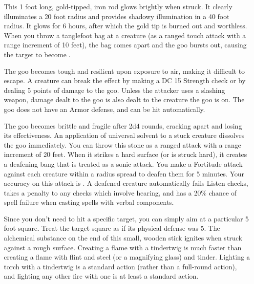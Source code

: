  This 1 foot long, gold-tipped, iron rod glows brightly when struck. It clearly illuminates a 20 foot radius and provides shadowy illumination in a 40 foot radius. It glows for 6 hours, after which the gold tip is burned out and worthless.
 When you throw a tanglefoot bag at a creature (as a ranged touch attack with a range increment of 10 feet), the bag comes apart and the goo bursts out, causing the target to become \entangled.
\par The goo becomes tough and resilient upon exposure to air, making it difficult to escape. A creature can break the effect by making a DC 15 Strength check or by dealing 5 points of damage to the goo. Unless the attacker uses a slashing weapon, damage dealt to the goo is also dealt to the creature the goo is on. The goo does not have an Armor defense, and can be hit automatically.
\par The goo becomes brittle and fragile after 2d4 rounds, cracking apart and losing its effectiveness. An application of universal solvent to a stuck creature dissolves the goo immediately.
 You can throw this stone as a ranged attack with a range increment of 20 feet. When it strikes a hard surface (or is struck hard), it creates a deafening bang that is treated as a sonic attack. You make a Fortitude attack against each creature within a \areasmall radius spread to deafen them for 5 minutes. Your accuracy on this attack is . A deafened creature automatically fails Listen checks, takes a  penalty to any checks which involve hearing, and has a 20\% chance of spell failure when casting spells with verbal components.
\par Since you don't need to hit a specific target, you can simply aim at a particular 5 foot square. Treat the target square as if its physical defense was 5.
 The alchemical substance on the end of this small, wooden stick ignites when struck against a rough surface. Creating a flame with a tindertwig is much faster than creating a flame with flint and steel (or a magnifying glass) and tinder. Lighting a torch with a tindertwig is a standard action (rather than a full-round action), and lighting any other fire with one is at least a standard action.

